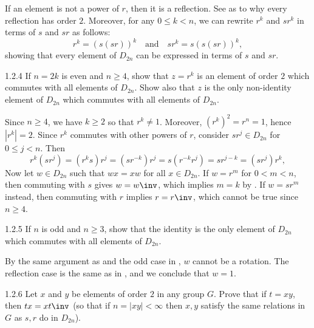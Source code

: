 \begin{sol}
    If an element is not a power of $r$, then it is a reflection.
	See  as to why every reflection has order $2$.
	Moreover, for any $0 \leq k < n$, we can rewrite $r^k$ and $sr^k$ in terms of $s$ and $sr$ as follows:
    \[
    	r^k = (s(sr))^k \quad \text{and} \quad sr^k = s(s(sr))^k,
    \]
    showing that every element of $D_{2n}$ can be expressed in terms of $s$ and $sr$.
\end{sol}

\begin{exercise}{1.2.4}
    If $n = 2k$ is even and $n \ge 4$, show that $z = r^k$ is an element of order $2$ which commutes with all elements of $D_{2n}$.
	Show also that $z$ is the only non-identity element of $D_{2n}$ which commutes with all elements of $D_{2n}$.

\end{exercise}
   
\begin{sol}
    Since $n \geq 4$, we have $k \geq 2$ so that $r^k \neq 1$.
	Moreover, $(r^k)^2 = r^n = 1$, hence $|r^k| = 2$.
	Since $r^k$ commutes with other powers of $r$, consider $sr^j \in D_{2n}$ for $0 \leq j < n$.
	Then
    \[
    	r^k(sr^j) = (r^ks)r^j = (sr^{-k})r^j = s(r^{-k}r^j) = s r^{j-k} = (sr^j) r^k,
    \]
    Now let $w \in D_{2n}$ such that $wx = xw$ for all $x \in D_{2n}$.
	If $w = r^m$ for $0 < m < n$, then commuting with $s$ gives $w = w\inv$, which implies $m = k$ by .
	If $w = sr^m$ instead, then commuting with $r$ implies $r = r\inv$, which cannot be true since $n \geq 4$.
\end{sol}

\begin{exercise}{1.2.5}
    If $n$ is odd and $n \geq 3$, show that the identity is the only element of $D_{2n}$ which commutes with all elements of $D_{2n}$.
    
\end{exercise}

\begin{sol}
    By the same argument as  and the odd case in , $w$ cannot be a rotation. The reflection case is the same as in , and we conclude that $w = 1$.
\end{sol}

\begin{exercise}{1.2.6}
    Let $x$ and $y$ be elements of order $2$ in any group $G$.
	Prove that if $t = xy$, then $tx = xt\inv$ (so that if $n = |xy| < \infty$ then $x, y$ satisfy the same relations in $G$ as $s, r$ do in $D_{2n}$).
\end{exercise}

